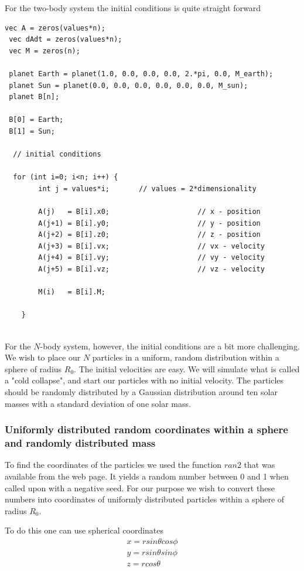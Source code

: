 \documentclass[a4paper,12pt, english]{article}
\begin{document}
For the two-body system the initial conditions is quite straight forward

 \begin{lstlisting}[title={Initial conditions two-body system}]
 vec A = zeros(values*n);
 vec dAdt = zeros(values*n);
 vec M = zeros(n);

 planet Earth = planet(1.0, 0.0, 0.0, 0.0, 2.*pi, 0.0, M_earth);
 planet Sun = planet(0.0, 0.0, 0.0, 0.0, 0.0, 0.0, M_sun);
 planet B[n];

 B[0] = Earth;
 B[1] = Sun;

  // initial conditions

  for (int i=0; i<n; i++) {
        int j = values*i;		// values = 2*dimensionality
       
        A(j)   = B[i].x0;                     // x - position
        A(j+1) = B[i].y0;                     // y - position
        A(j+2) = B[i].z0;                     // z - position
        A(j+3) = B[i].vx;                     // vx - velocity
        A(j+4) = B[i].vy;                     // vy - velocity
        A(j+5) = B[i].vz;                     // vz - velocity

        M(i)   = B[i].M;
        
    }
 
 \end{lstlisting}
 
 
For the $N$-body system, however, the initial conditions are a bit more challenging. We wish to place our $N$ particles in a uniform, random distribution within a sphere of radius $R_0$. The initial velocities are easy. We will simulate what is called a "cold collapse", and start our particles with no initial velocity. The particles should be randomly distributed by a Gaussian distribution around ten solar masses with a standard deviation of one solar mass.  


\subsubsection*{Uniformly distributed random coordinates within a sphere and randomly distributed mass}

To find the coordinates of the particles we used the function $ran2$ that was available from the web page. It yields a random number between 0 and 1 when called upon with a negative seed. For our purpose we wish to convert these numbers into coordinates of uniformly distributed particles within a sphere of radius $R_0$. 

To do this one can use spherical coordinates
\begin{align}
x = r sin \theta cos \phi \\
y = r sin \theta sin \phi \\
z = r cos \theta
\end{align}
\end{document}
